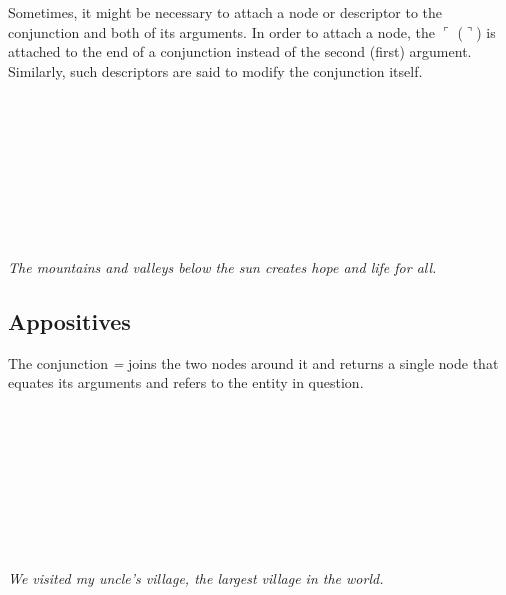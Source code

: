 \documentclass{book}
\begin{document}
Sometimes, it might be necessary to attach a node or descriptor to the conjunction and both of its arguments. In order to attach a node, the $\ulcorner$ ($\urcorner$) is attached to the end of a conjunction instead of the second (first) argument. Similarly, such descriptors are said to modify the conjunction itself. \\
~\\
 \\
 \\
\hli{$\llcorner$}      \\
~\\
 \\
 \\
      \\
~\\
\emph{The mountains and valleys below the sun creates hope and life for all.}

\subsection{Appositives}

The conjunction  \emph{=} joins the two nodes around it and returns a single node that equates its arguments and refers to the entity in question. \\
~\\
 \\
 \\
     \hlvi{$\lrcorner$}  \hlviii{$\lrcorner$} \hlix{=} \\
~\\
 \\
 \\
    \\
~\\
\emph{We visited my uncle's village, the largest village in the world.}
\end{document}
